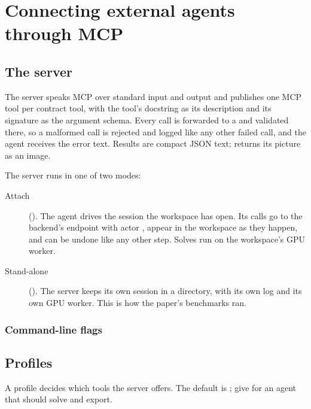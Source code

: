 \chapter{Connecting external agents through MCP}\label{ch:mcp}

\section{The server}
The server speaks MCP over standard input and output and publishes one MCP tool per contract tool, with the tool's
docstring as its description and its signature as the argument schema. Every call is forwarded to a
 and validated there, so a malformed call is rejected and logged like any other failed call, and the agent
receives the error text. Results are compact JSON text;  returns its picture as an image.

The server runs in one of two modes:
\begin{description}
  \item[Attach] (). The agent drives the session the workspace has open. Its calls go
  to the backend's  endpoint with actor , appear in the workspace as they happen,
  and can be undone like any other step. Solves run on the workspace's GPU worker.
  \item[Stand-alone] (). The server keeps its own session in a directory, with its own log and its
  own GPU worker. This is how the paper's benchmarks ran.
\end{description}

\subsection*{Command-line flags}


\section{Profiles}\label{sec:profiles}
A profile decides which tools the server offers. The default is ; give  for an agent
that should solve and export.

